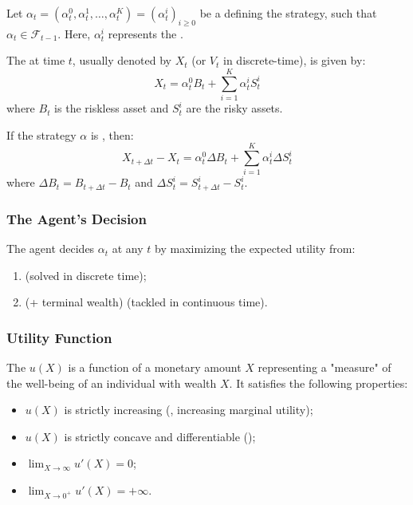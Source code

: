 Let $\alpha_t = (\alpha_t^0, \alpha_t^1, \dots, \alpha_t^K) = (\alpha_t^i)_{i \geq 0}$ be a  defining the strategy, such that $\alpha_t \in \mathcal{F}_{t-1}$. 
Here, $\alpha_t^i$ represents the .

The  at time $t$, usually denoted by $X_t$ (or $V_t$ in discrete-time), is given by:
\begin{equation}
    X_t = \alpha_t^0 B_t + \sum_{i=1}^K \alpha_t^i S_t^i
\end{equation}
where $B_t$ is the riskless asset and $S_t^i$ are the risky assets.

If the strategy $\alpha$ is , then:
\begin{equation}
    X_{t+\Delta t} - X_t = \alpha_t^0 \Delta B_t + \sum_{i=1}^K \alpha_t^i \Delta S_t^i
\end{equation}
where $\Delta B_t = B_{t+\Delta t} - B_t$ and $\Delta S_t^i = S_{t+\Delta t}^i - S_t^i$.

\subsubsection{The Agent's Decision}

The agent decides $\alpha_t$ at any $t$ by maximizing the expected utility from:
\begin{enumerate}
    \item {} (solved in discrete time);
    \item {} (+ terminal wealth) (tackled in continuous time).
\end{enumerate}

\subsubsection{Utility Function}

The  $u(X)$ is a function of a monetary amount $X$ representing a "measure" of the well-being of an individual with wealth $X$. It satisfies the following properties:
\begin{itemize}
    \item $u(X)$ is strictly increasing (, increasing marginal utility);
    \item $u(X)$ is strictly concave and differentiable ();
    \item $\lim_{X \to \infty} u'(X) = 0$;
    \item $\lim_{X \to 0^+} u'(X) = +\infty$.
\end{itemize}

